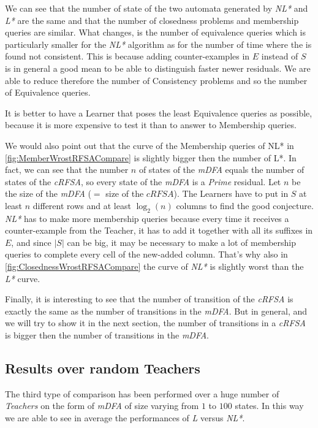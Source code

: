 We can see that the number of state of the two automata generated by \textit{NL*} and \textit{L*} are the same and that the number of closedness problems and membership queries are similar. What changes, is the number of equivalence queries which is particularly smaller for the \textit{NL*} algorithm as for the number of time where the \OT is found not consistent. This is because adding counter-examples in $E$ instead of $S$ is in general a good mean to be able to distinguish faster newer residuals. We are able to reduce therefore the number of Consistency problems and so the number of Equivalence queries.

\begin{remark}
  It is better to have a Learner that poses the least Equivalence queries as possible, because it is more expensive to test it than to answer to Membership queries.
\end{remark}

We would also point out that the curve of the Membership queries of NL* in \cref{fig:MemberWrostRFSACompare} is slightly bigger then the number of L*. In fact, we can see that the number $n$ of states of the \textit{mDFA} equals the number of states of the \textit{cRFSA}, so every state of the \textit{mDFA} is a \textit{Prime} residual. Let $n$ be the size of the \textit{mDFA} ($=$ size of the $\textit{cRFSA}$). The Learners have to put in $S$ at least $n$ different rows and at least $\log_2(n)$ columns to find the good conjecture. \textit{NL*} has to make more membership queries because every time it receives a counter-example from the Teacher, it has to add it together with all its suffixes in $E$, and since $|S|$ can be big, it may be necessary to make a lot of membership queries to complete every cell of the new-added column. That's why also in \cref{fig:ClosednessWrostRFSACompare} the curve of \textit{NL*} is slightly worst than the \textit{L*} curve.

Finally, it is interesting to see that the number of transition of the \textit{cRFSA} is exactly the same as the number of transitions in the \textit{mDFA}. But in general, and we will try to show it in the next section, the number of transitions in a \textit{cRFSA} is bigger then the number of transitions in the \textit{mDFA}.

\subsection{Results over random Teachers}

The third type of comparison has been performed over a huge number of \textit{Teachers} on the form of \textit{mDFA} of size varying from $1$ to $100$ states. In this way we are able to see in average the performances of \textit{L} versus \textit{NL*}.

